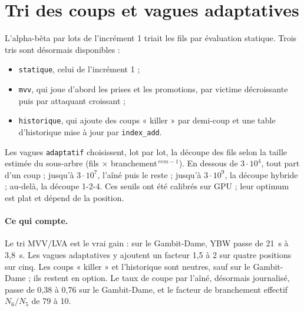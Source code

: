 \documentclass[11pt,a4paper]{article}
\newcommand{\code}[1]{\texttt{#1}}
\begin{document}
\section{Tri des coups et vagues adaptatives}
L'alpha-bêta par lots de l'incrément 1 triait les fils par évaluation statique. Trois tris sont
désormais disponibles :
\begin{itemize}
\item \code{statique}, celui de l'incrément 1 ;
\item \code{mvv}, qui joue d'abord les prises et les promotions, par victime décroissante puis par
attaquant croissant ;
\item \code{historique}, qui ajoute des coups « killer » par demi-coup et une table d'historique
mise à jour par \code{index\_add}.
\end{itemize}
Les vagues \code{adaptatif} choisissent, lot par lot, la découpe des fils selon la taille estimée
du sous-arbre (fils $\times$ branchement$^{\,rem-1}$). En dessous de $3\cdot10^4$, tout part d'un
coup ; jusqu'à $3\cdot10^7$, l'aîné puis le reste ; jusqu'à $3\cdot10^9$, la découpe hybride ;
au-delà, la découpe 1-2-4. Ces seuils ont été calibrés sur GPU ; leur optimum est plat et dépend de
la position.

\begin{table}[H]
\centering\small
\caption{Temps mur à profondeur 6, quiescence 4, sur le pod de l'agent B. La valeur minimax est
identique dans chaque ligne.}
\end{table}

\paragraph{Ce qui compte.} Le tri MVV/LVA est le vrai gain : sur le Gambit-Dame, YBW passe de 21~s à
3{,}8~s. Les vagues adaptatives y ajoutent un facteur 1{,}5 à 2 sur quatre positions sur cinq. Les
coups « killer » et l'historique sont neutres, sauf sur le Gambit-Dame ; ils restent en option. Le
taux de coupe par l'aîné, désormais journalisé, passe de 0{,}38 à 0{,}76 sur le Gambit-Dame, et le
facteur de branchement effectif $N_6/N_5$ de 79 à 10.
\end{document}
